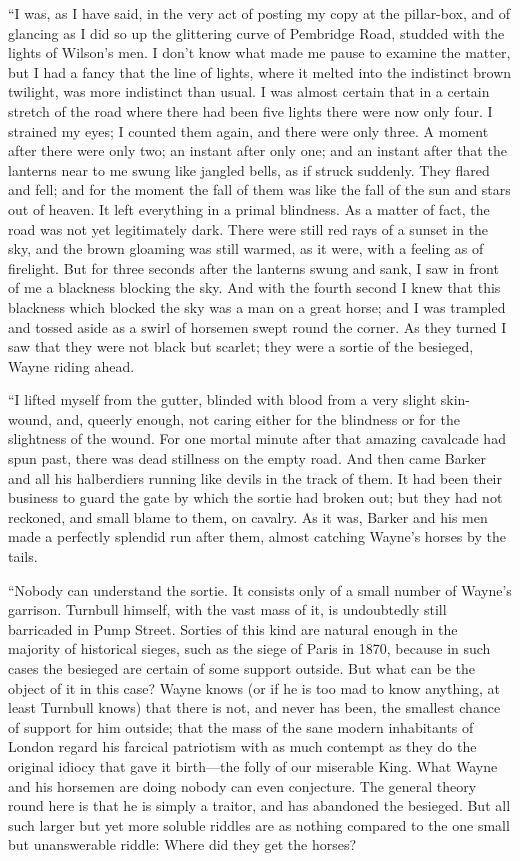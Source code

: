 \documentclass{book}
\begin{document}
“I was, as I have said, in the very act of posting my copy at the pillar-box, and of glancing as I did so up the glittering curve of Pembridge Road, studded with the lights of Wilson’s men. I don’t know what made me pause to examine the matter, but I had a fancy that the line of lights, where it melted into the indistinct brown twilight, was more indistinct than usual. I was almost certain that in a certain stretch of the road where there had been five lights there were now only four. I strained my eyes; I counted them again, and there were only three. A moment after there were only two; an instant after only one; and an instant after that the lanterns near to me swung like jangled bells, as if struck suddenly. They flared and fell; and for the moment the fall of them was like the fall of the sun and stars out of heaven. It left everything in a primal blindness. As a matter of fact, the road was not yet legitimately dark. There were still red rays of a sunset in the sky, and the brown gloaming was still warmed, as it were, with a feeling as of firelight. But for three seconds after the lanterns swung and sank, I saw in front of me a blackness blocking the sky. And with the fourth second I knew that this blackness which blocked the sky was a man on a great horse; and I was trampled and tossed aside as a swirl of horsemen swept round the corner. As they turned I saw that they were not black but scarlet; they were a sortie of the besieged, Wayne riding ahead.

“I lifted myself from the gutter, blinded with blood from a very slight skin-wound, and, queerly enough, not caring either for the blindness or for the slightness of the wound. For one mortal minute after that amazing cavalcade had spun past, there was dead stillness on the empty road. And then came Barker and all his halberdiers running like devils in the track of them. It had been their business to guard the gate by which the sortie had broken out; but they had not reckoned, and small blame to them, on cavalry. As it was, Barker and his men made a perfectly splendid run after them, almost catching Wayne’s horses by the tails.

“Nobody can understand the sortie. It consists only of a small number of Wayne’s garrison. Turnbull himself, with the vast mass of it, is undoubtedly still barricaded in Pump Street. Sorties of this kind are natural enough in the majority of historical sieges, such as the siege of Paris in 1870, because in such cases the besieged are certain of some support outside. But what can be the object of it in this case? Wayne knows (or if he is too mad to know anything, at least Turnbull knows) that there is not, and never has been, the smallest chance of support for him outside; that the mass of the sane modern inhabitants of London regard his farcical patriotism with as much contempt as they do the original idiocy that gave it birth—the folly of our miserable King. What Wayne and his horsemen are doing nobody can even conjecture. The general theory round here is that he is simply a traitor, and has abandoned the besieged. But all such larger but yet more soluble riddles are as nothing compared to the one small but unanswerable riddle: Where did they get the horses?
\end{document}
